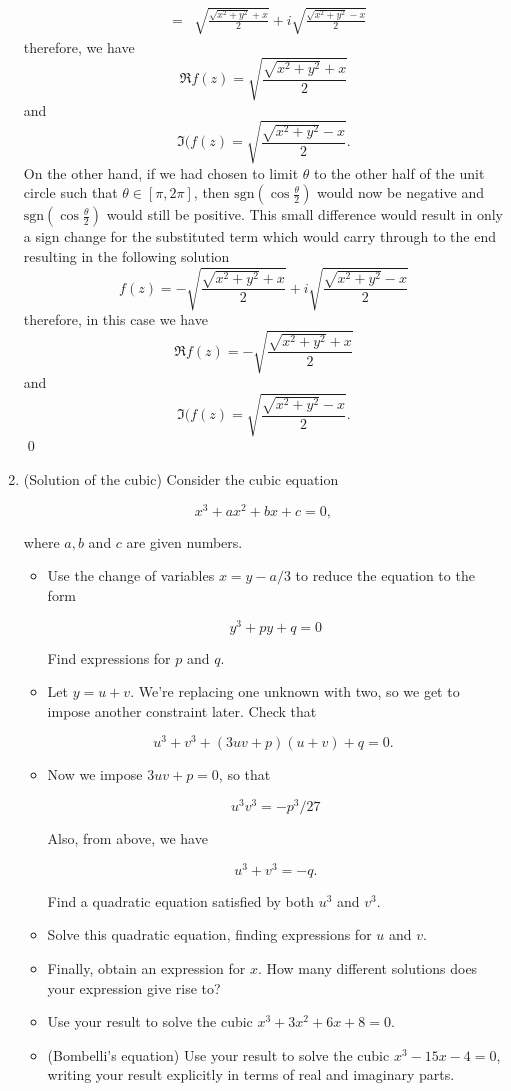 \documentclass[10pt]{amsart}
\theoremstyle{nonumberplain}
\begin{document}
\begin{enumerate}[label={\bf {\arabic*}:}]
\begin{eqnarray*}
      &=& \sqrt{ \frac{ \sqrt{x^2 + y^2} + x }{ 2 }} +i \sqrt{ \frac{ \sqrt{x^2 + y^2} - x }{ 2 }}
\end{eqnarray*}
therefore, we have $$\Re{f(z)} = \sqrt{ \frac{ \sqrt{x^2 + y^2} + x }{ 2 }}$$ and $$\Im{(f(z)} = \sqrt{ \frac{ \sqrt{x^2 + y^2} - x }{ 2 }}.$$
On the other hand, if we had chosen to limit $\theta$ to the other half of the unit circle such that $\theta \in [\pi, 2\pi]$, then $\text{sgn} \left(\cos \frac{\theta}{2}\right)$ would now be negative and $\text{sgn} \left(\cos \frac{\theta}{2}\right)$ would still be positive.
This small difference would result in only a sign change for the substituted term which would carry through to the end resulting in the following solution
$$f(z) = -\sqrt{ \frac{ \sqrt{x^2 + y^2} + x }{ 2 }} +i \sqrt{ \frac{ \sqrt{x^2 + y^2} - x }{ 2 }}$$
therefore, in this case we have $$\Re{f(z)} = -\sqrt{ \frac{ \sqrt{x^2 + y^2} + x }{ 2 }}$$ and $$\Im{(f(z)} = \sqrt{ \frac{ \sqrt{x^2 + y^2} - x }{ 2 }}.$$
\qed


\item (Solution of the cubic) Consider the cubic equation

$$
x^3+a x^2+b x+c=0,
$$

where $a, b$ and $c$ are given numbers.
\begin{itemize}
\item Use the change of variables $x=y-a / 3$ to reduce the equation to the form

$$
y^3+p y+q=0
$$


Find expressions for $p$ and $q$.
\item Let $y=u+v$. We're replacing one unknown with two, so we get to impose another constraint later. Check that

$$
u^3+v^3+(3 u v+p)(u+v)+q=0 \text {. }
$$

\item Now we impose $3 u v+p=0$, so that

$$
u^3 v^3=-p^3 / 27
$$

Also, from above, we have

$$
u^3+v^3=-q .
$$

Find a quadratic equation satisfied by both $u^3$ and $v^3$.
\item Solve this quadratic equation, finding expressions for $u$ and $v$.
\item Finally, obtain an expression for $x$. How many different solutions does your expression give rise to?
\item Use your result to solve the cubic $x^3+3 x^2+6 x+8=0$.
\item (Bombelli's equation) Use your result to solve the cubic $x^3-15
  x-4=0$, writing your result explicitly in terms of real and
  imaginary parts.
  \end{itemize}



\end{enumerate}
\end{document}

